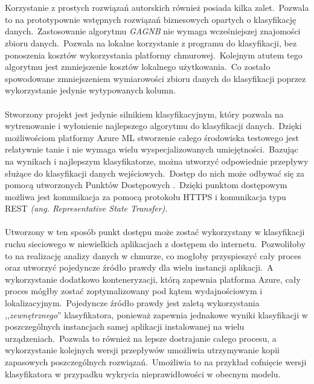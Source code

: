 \\ \\
Korzystanie z prostych rozwiązań autorskich również posiada kilka zalet.\ Pozwala to na prototypownie wstępnych rozwiązań biznesowych opartych o klasyfikację danych.\ Zastosowanie algorytmu \textit{GAGNB} nie wymaga wcześniejszej znajomości zbioru danych.\ Pozwala na lokalne korzystanie z programu do klasyfikacji, bez ponoszenia kosztów wykorzystania platformy chmurowej.\ Kolejnym atutem tego algorytmu jest zmniejszenie kosztów lokalnego użytkowania.\ Co zostało spowodowane zmniejszeniem wymiarowości zbioru danych do klasyfikacji poprzez wykorzystanie jedynie wytypowanych kolumn.
\\ \\
Stworzony projekt jest jedynie silnikiem klasyfikacyjnym, który pozwala na wytrenowanie i wyłonienie najlepszego algorytmu do klasyfikacji danych.\ Dzięki możliwościom platformy Azure ML stworzenie całego środowiska testowego jest relatywnie tanie i nie wymaga wielu wyspecjalizowanych umiejętności.\ Bazując na wynikach i najlepszym klasyfikatorze, można utworzyć odpowiednie przepływy służące do klasyfikacji danych wejściowych.\ Dostęp do nich może odbywać się za pomocą utworzonych Punktów Dostępowych .\ Dzięki punktom dostępowym możliwa jest komunikacja za pomocą protokołu HTTPS  i komunikacja typu REST \textit{(ang. Representative State Transfer)}.
\\ \\
Utworzony w ten sposób punkt dostępu może zostać wykorzystany w klasyfikacji ruchu sieciowego w niewielkich aplikacjach z dostępem do internetu.\ Pozwoliłoby to na realizację analizy danych w chmurze, co mogłoby przyspieszyć cały proces oraz utworzyć pojedyncze źródło prawdy dla wielu instancji aplikacji.\ A wykorzystanie dodatkowo konteneryzacji, którą zapewnia platforma Azure, cały proces mógłby zostać zoptymalizowany pod kątem wydajnościowym i lokalizacyjnym.\ Pojedyncze źródło prawdy jest zaletą wykorzystania ,,\textit{zewnętrznego}'' klasyfikatora, ponieważ zapewnia jednakowe wyniki klasyfikacji w poszczególnych instancjach samej aplikacji instalowanej na wielu urządzeniach.\ Pozwala to również na lepsze dostrajanie całego procesu, a wykorzystanie kolejnych wersji przepływów umożliwia utrzymywanie kopii zapasowych poszczególnych rozwiązań.\ Umożliwia to na przykład cofnięcie wersji klasyfikatora w przypadku wykrycia nieprawidłowości w obecnym modelu.

